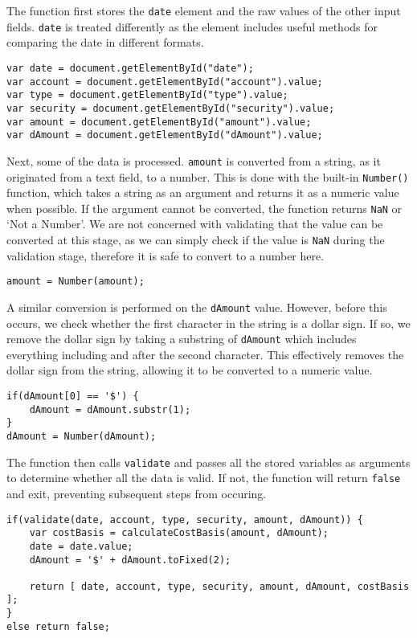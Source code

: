 \documentclass[letterpaper]{article}
\begin{document}
The function first stores the \lstinline{date} element and the raw values of the other input fields.
\lstinline{date} is treated differently as the element includes useful methods for comparing the date in different formats.

\begin{lstlisting}[firstnumber=2]
var date = document.getElementById("date");
var account = document.getElementById("account").value;
var type = document.getElementById("type").value;
var security = document.getElementById("security").value;
var amount = document.getElementById("amount").value;
var dAmount = document.getElementById("dAmount").value;
\end{lstlisting}

Next, some of the data is processed.
\lstinline{amount} is converted from a string, as it originated from a text field, to a number.
This is done with the built-in \lstinline{Number()} function, which takes a string as an argument and returns it as a numeric value when possible.
If the argument cannot be converted, the function returns \lstinline{NaN} or `Not a Number'.
We are not concerned with validating that the value can be converted at this stage, as we can simply check if the value is \lstinline{NaN} during the validation stage, therefore it is safe to convert to a number here.

\begin{lstlisting}[firstnumber=9]
amount = Number(amount);
\end{lstlisting}

A similar conversion is performed on the \lstinline{dAmount} value.
However, before this occurs, we check whether the first character in the string is a dollar sign.
If so, we remove the dollar sign by taking a substring of \lstinline{dAmount} which includes everything including and after the second character.
This effectively removes the dollar sign from the string, allowing it to be converted to a numeric value.

\begin{lstlisting}[firstnumber=9]
if(dAmount[0] == '$') {
    dAmount = dAmount.substr(1);
}
dAmount = Number(dAmount);
\end{lstlisting}

The function then calls \lstinline{validate} and passes all the stored variables as arguments to determine whether all the data is valid.
If not, the function will return \lstinline{false} and exit, preventing subsequent steps from occuring.

\begin{lstlisting}[firstnumber=16]
if(validate(date, account, type, security, amount, dAmount)) {
    var costBasis = calculateCostBasis(amount, dAmount);
    date = date.value;
    dAmount = '$' + dAmount.toFixed(2);

    return [ date, account, type, security, amount, dAmount, costBasis ];
}
else return false;
\end{lstlisting}
\end{document}

